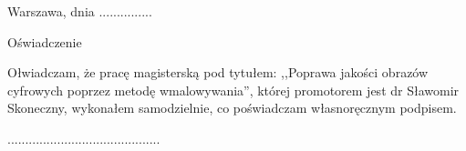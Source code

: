 \documentclass[12pt, twoside, openany]{report}
\theoremstyle{definition}
\begin{document}
 
\tableofcontents
\clearpage
\pagestyle{empty}
\noindent Warszawa, dnia ...............
\vspace{5cm}
\begin{center}
\LARGE{Oświadczenie}
\end{center}
Ołwiadczam, że pracę magisterską pod tytułem: ,,Poprawa jakości obrazów cyfrowych poprzez metodę wmalowywania'', której promotorem jest dr Sławomir Skoneczny, wykonałem samodzielnie, co poświadczam własnoręcznym podpisem.
\vspace{2cm}
\begin{flushright}
...........................................
\end{flushright}
\end{document}
